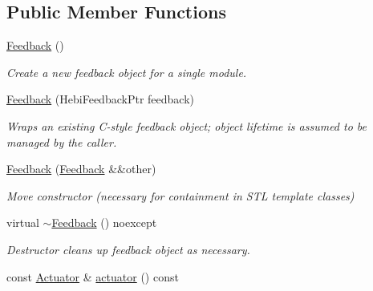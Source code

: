 \subsection*{Public Member Functions}
\begin{DoxyCompactItemize}
\item 
\hyperlink{classhebi_1_1Feedback_aa24d88a1a9f74231e74d75a09ca3f2d8}{Feedback} ()\hypertarget{classhebi_1_1Feedback_aa24d88a1a9f74231e74d75a09ca3f2d8}{}\label{classhebi_1_1Feedback_aa24d88a1a9f74231e74d75a09ca3f2d8}

\begin{DoxyCompactList}\small\item\em Create a new feedback object for a single module. \end{DoxyCompactList}\item 
\hyperlink{classhebi_1_1Feedback_a172321e2516f2bca57a1e32d0263bd3f}{Feedback} (Hebi\+Feedback\+Ptr feedback)
\begin{DoxyCompactList}\small\item\em Wraps an existing C-\/style feedback object; object lifetime is assumed to be managed by the caller. \end{DoxyCompactList}\item 
\hyperlink{classhebi_1_1Feedback_ab2d48835e8c66094b5f058d52d95417f}{Feedback} (\hyperlink{classhebi_1_1Feedback}{Feedback} \&\&other)\hypertarget{classhebi_1_1Feedback_ab2d48835e8c66094b5f058d52d95417f}{}\label{classhebi_1_1Feedback_ab2d48835e8c66094b5f058d52d95417f}

\begin{DoxyCompactList}\small\item\em Move constructor (necessary for containment in S\+TL template classes) \end{DoxyCompactList}\item 
virtual \hyperlink{classhebi_1_1Feedback_a4d4b06211530ace089ec434f0c742b68}{$\sim$\+Feedback} () noexcept\hypertarget{classhebi_1_1Feedback_a4d4b06211530ace089ec434f0c742b68}{}\label{classhebi_1_1Feedback_a4d4b06211530ace089ec434f0c742b68}

\begin{DoxyCompactList}\small\item\em Destructor cleans up feedback object as necessary. \end{DoxyCompactList}\item 
const \hyperlink{classhebi_1_1Feedback_1_1Actuator}{Actuator} \& \hyperlink{classhebi_1_1Feedback_aba9c2b0fa8c94aeda647dd4ad99db0b1}{actuator} () const \hypertarget{classhebi_1_1Feedback_aba9c2b0fa8c94aeda647dd4ad99db0b1}{}\label{classhebi_1_1Feedback_aba9c2b0fa8c94aeda647dd4ad99db0b1}


\end{DoxyCompactItemize}
